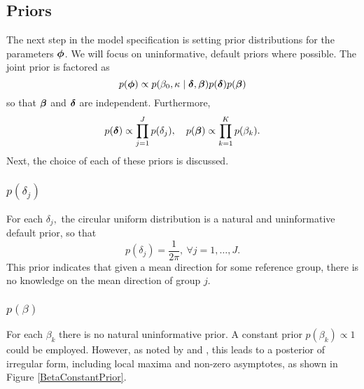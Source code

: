 \subsection{Priors}

The next step in the model specification is setting prior distributions for the parameters \( \boldsymbol{\phi} \). We will focus on uninformative, default priors where possible. The joint prior is factored as
\begin{equation}
p(\boldsymbol{\phi}) \propto p(\beta_0, \kappa \mid \boldsymbol{\delta}, \boldsymbol{\beta}) p(\boldsymbol{\delta}) p(\boldsymbol{\beta})
\end{equation}
so that \( \boldsymbol{\beta} \) and \( \boldsymbol{\delta} \) are independent. Furthermore,
\begin{equation}
p(\boldsymbol{\delta}) \propto \prod_{j=1}^J p(\delta_j), \quad p(\boldsymbol{\beta}) \propto \prod_{k=1}^K p(\beta_k).
\end{equation}
Next, the choice of each of these priors is discussed.

\subsubsection{$p(\delta_j)$}

For each \( \delta_j,\)  the circular uniform distribution is a natural and uninformative default prior, so that
\begin{equation}
p(\delta_j) = \frac{1}{2 \pi}, ~ \forall j = 1, \dots, J.
\end{equation}
This prior indicates that given a mean direction for some reference group, there is no knowledge on the mean direction of group \( j.\)

\subsubsection{$p(\beta)$} \label{betaprior}

For each \(\beta_k\) there is no natural uninformative prior. A constant prior \( p(\beta_k) \propto 1 \) could be employed. However, as noted by \citet{fisher1995statistical} and \citet{gill2010}, this leads to a posterior of irregular form, including local maxima and non-zero asymptotes, as shown in Figure \ref{BetaConstantPrior}.

